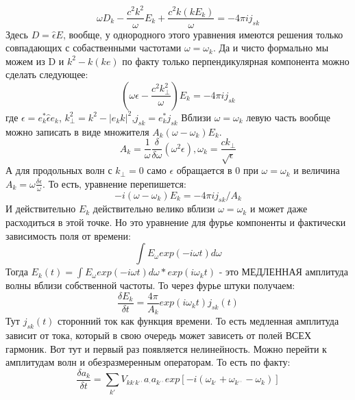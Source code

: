 \documentclass[10pt, a4paper]{article}
\begin{document}
\begin{equation}
	\omega D_k - \frac{c^{2} k^{2}}{\omega} E_k + \frac{c^2 k(k E_k)}{\omega}=-4 \pi i j_{sk}
\end{equation}
Здесь $D=\hat{\epsilon} E$, вообще, у однородного этого уравнения имеются решения только совпадающих с собаственными частотами $\omega=\omega_k$. Да и чисто формально мы можем из D и $k^2-k(k e)$ по факту только перпендикулярная компонента можно сделать следующее:
\begin{equation}
	(\omega \epsilon - \frac{c^{2} k^{2}_{\perp}}{\omega}) E_k = -4 \pi i j_{sk}
\end{equation}
где $\epsilon=e^{*}_k \hat{\epsilon} e_k$, $k^{2}_{\perp}=k^{2}-|e_k k|^2$,$j_{sk}=e^{*}_k j_{sk}$
Вблизи $\omega=\omega_k$ левую часть вообще можно записать в виде множителя $A_k (\omega - \omega_k) E_k$.
\begin{equation}
	A_k=\frac{1}{\omega} \frac{\delta}{\delta \omega} (\omega^2 \epsilon) , \omega_k=\frac{ck_{\perp}}{\sqrt{\epsilon}}
\end{equation}
А для продольных волн с $k_{\perp}=0$ само $\epsilon$ обращается в 0 при   $\omega=\omega_k$ и величина $A_k= \omega \frac{\delta \epsilon}{\omega}$. То есть, уравнение перепишется:
\begin{equation}
	-i(\omega - \omega_k) E_k=-4 \pi i j_{sk}/A_k
\end{equation}
И действительно $E_k$ действительно велико вблизи $\omega=\omega_k$ и может даже расходиться в этой точке. Но это уравнение для фурье компоненты и фактически зависимость поля от времени:
\begin{equation}
	\int E_{\omega} exp(-i \omega t) d \omega
\end{equation}
Тогда $E_k (t) = \int E_{\omega} exp(-i \omega t) d \omega *exp(i \omega_k t)$ - это МЕДЛЕННАЯ амплитуда волны вблизи собственной частоты. То через фурье штуки получаем:
\begin{equation}
	\frac{\delta E_k}{\delta t} = \frac{4 \pi}{A_k} exp(i \omega_k t) j_{sk} (t)
\end{equation}
Тут $j_{sk} (t)$ сторонний ток как функция времени. То есть медленная амплитуда зависит от тока, который в свою очередь может зависеть от полей ВСЕХ гармоник. Вот тут и первый раз появляется нелинейность. Можно перейти к амплитудам волн и обезразмеренным операторам. То есть по факту:
\begin{equation}
	\frac{\delta a_k}{\delta t} =\sum_{k'} V_{k k^{,} k^{,,}} a_{^{,}} a_{k^{,,}} exp[-i(\omega_{k^{,}}+\omega_{k^{,,}}-\omega_k)] 
\end{equation}
\end{document}

